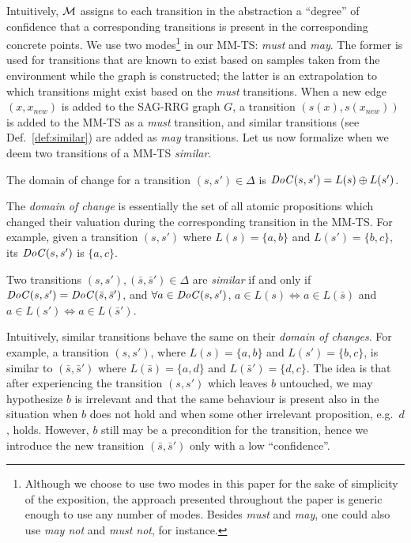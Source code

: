 Intuitively, $\mathcal{M}$ assigns to each transition in the abstraction a ``degree'' of confidence that a corresponding transitions is present in the corresponding concrete points.
We use two modes\footnote{Although we choose to use two modes in this paper for the sake of simplicity of the exposition, the approach presented throughout the paper is generic enough to use any number of modes. Besides \emph{must} and \emph{may}, one could also use \emph{may not} and \emph{must not}, for instance.} in our MM-TS: \emph{must} and \emph{may}. The former is used for transitions that are known to exist based on samples taken from the environment while the graph is constructed; the latter is an extrapolation to which transitions might exist based on the \emph{must} transitions.
When a new edge $(x, x_{\mathit{new}})$ is added to the SAG-RRG graph $G$, a transition $(s(x),s(x_{\mathit{new}}))$ is added to the MM-TS as a \emph{must} transition, and similar transitions (see Def.~\ref{def:similar}) are added as \emph{may} transitions.
%
Let us now formalize when we deem two transitions of a MM-TS \emph{similar}.

\begin{definition} 
The domain of change for a transition $(s, s') \in \Delta$ is $\mathit{DoC}(s,s') = L(s) \oplus L(s')$.
\end{definition}

The \emph{domain of change} is essentially the set of all atomic propositions which changed their valuation during the corresponding transition in the MM-TS. For example, given a transition $(s, s')$ where $L(s)=\{a,b\}$ and $L(s')=\{b,c\}$, its $\mathit{DoC}(s, s')$ is $\{a,c\}$. 

\begin{definition} \label{def:similar}
 Two transitions $(s, s'), (\bar s, \bar s') \in \Delta$ are \emph{similar} if and only if $\mathit{DoC}(s,s')=\mathit{DoC}(\bar s, \bar s')$, and $\forall a\in \mathit{DoC}(s, s')$, $a \in L(s) \iff a \in L(\bar s)$ and $a \in L(s') \iff a \in L(\bar s')$.
\end{definition}

Intuitively, similar transitions behave the same on their \emph{domain of changes}. For example, a transition $(s,s')$, where $L(s)=\{a,b\}$ and $L(s')=\{b,c\}$, is similar to $(\bar s, \bar s')$ where $L(\bar s)=\{a,d\}$ and $L(\bar s')=\{d,c\}$.
The idea is that after experiencing the transition $(s,s')$ which leaves $b$ untouched, we may hypothesize $b$ is irrelevant and that the same behaviour is present also in the situation when $b$ does not hold and when some other irrelevant proposition, e.g.~$d$, holds.
However, $b$ still may be a precondition for the transition, hence we introduce the new transition $(\bar s, \bar s')$ only with a low ``confidence''.

